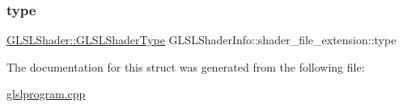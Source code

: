 \subsubsection{\texorpdfstring{type}{type}}
{\footnotesize\ttfamily \mbox{\hyperlink{namespace_g_l_s_l_shader_a5da03bdfde28d414fcf090182b3b8177}{G\+L\+S\+L\+Shader\+::\+G\+L\+S\+L\+Shader\+Type}} G\+L\+S\+L\+Shader\+Info\+::shader\+\_\+file\+\_\+extension\+::type}



The documentation for this struct was generated from the following file\+:\begin{DoxyCompactItemize}
\item 
\mbox{\hyperlink{glslprogram_8cpp}{glslprogram.\+cpp}}\end{DoxyCompactItemize}

